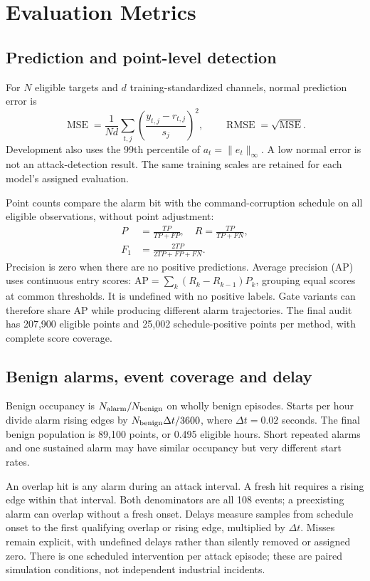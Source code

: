 \section{Evaluation Metrics}\label{sec:metrics}
\subsection{Prediction and point-level detection}
For $N$ eligible targets and $d$ training-standardized channels, normal prediction error is
\begin{equation}
 \operatorname{MSE}=\frac{1}{Nd}\sum_{t,j}\left(\frac{y_{t,j}-r_{t,j}}{s_j}\right)^2,
 \qquad \operatorname{RMSE}=\sqrt{\operatorname{MSE}}.
\end{equation}
Development also uses the 99th percentile of $a_t=\|e_t\|_\infty$. A low normal error is not an attack-detection result. The same training scales are retained for each model's assigned evaluation.

Point counts compare the alarm bit with the command-corruption schedule on all eligible observations, without point adjustment:
\begin{align}
 P&=\frac{TP}{TP+FP},\quad R=\frac{TP}{TP+FN},\\
 F_1&=\frac{2TP}{2TP+FP+FN}.
\end{align}
Precision is zero when there are no positive predictions. Average precision (AP) uses continuous entry scores: $\mathrm{AP}=\sum_k(R_k-R_{k-1})P_k$, grouping equal scores at common thresholds. It is undefined with no positive labels. Gate variants can therefore share AP while producing different alarm trajectories. The final audit has 207,900 eligible points and 25,002 schedule-positive points per method, with complete score coverage.

\subsection{Benign alarms, event coverage and delay}
Benign occupancy is $N_{\rm alarm}/N_{\rm benign}$ on wholly benign episodes. Starts per hour divide alarm rising edges by $N_{\rm benign}\Delta t/3600$, where $\Delta t=0.02$ seconds. The final benign population is 89,100 points, or 0.495 eligible hours. Short repeated alarms and one sustained alarm may have similar occupancy but very different start rates.

An overlap hit is any alarm during an attack interval. A fresh hit requires a rising edge within that interval. Both denominators are all 108 events; a preexisting alarm can overlap without a fresh onset. Delays measure samples from schedule onset to the first qualifying overlap or rising edge, multiplied by $\Delta t$. Misses remain explicit, with undefined delays rather than silently removed or assigned zero. There is one scheduled intervention per attack episode; these are paired simulation conditions, not independent industrial incidents.

